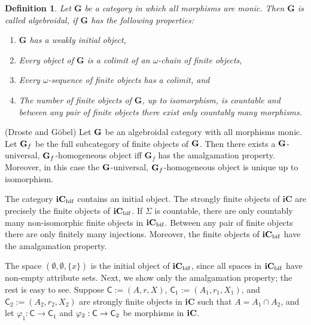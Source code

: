 \documentclass{LMCS}
\let\pf\proof
\newtheorem{defn}{Definition}[section]
\begin{document}
\begin{defn}
  Let $\mathbf{G}$ be a category in which all morphisms are monic. 
  Then $\mathbf{G}$ is called \emph{algebroidal}, if $\mathbf{G}$ has
  the following properties:

\begin{enumerate}[(1)]
\item $\mathbf{G}$ has a weakly initial object,
\item Every object of $\mathbf{G}$ is a colimit of an $\omega$-chain of
finite objects,
\item Every $\omega$-sequence of finite objects has a colimit, and
\item The number of finite objects of $\mathbf{G}$, up to isomorphism,
  is countable and between any pair of finite objects there exist only
  countably many morphisms. 
\end{enumerate}

\end{defn}


\begin{thm}\label{th:univ} (Droste and G\"{o}bel)
  Let ${\bf G}$ be an algebroidal category with all morphisms monic. 
  Let ${\bf G}_f$ be the full subcategory of finite objects of ${\bf
    G}$.  Then there exists a ${\bf G}$-universal, ${\bf
    G}_f$-homogeneous object iff $\mathbf{G}_f$ has the amalgamation
  property.  Moreover, in this case the ${\bf G}$-universal, ${\bf
    G}_f$-homogeneous object is unique up to isomorphism. 
\end{thm}


\begin{prop}\label{amalg} The category $\mathbf{iC}_{\rm bif}$
  contains an initial object. The strongly finite objects of
  $\mathbf{iC}$ are precisely the finite objects of $\mathbf{iC}_{\rm
    bif}$. If $\Sigma$ is countable, there are only countably many
  non-isomorphic finite objects in ${\bf iC}_{\rm bif}$. 
  Between any pair of finite objects there are only finitely
  many injections. Moreover, the finite objects of ${\bf
    iC}_{\rm bif}$ have the amalgamation property. 
\end{prop}

\pf The space $(\emptyset, \emptyset, \{x\})$ is the initial object of
$\mathbf{iC}_{\rm bif}$, since all spaces in $\mathbf{iC}_{\rm bif}$
have non-empty attribute sets. Next, we show only the amalgamation
property; the rest is easy to see.  Suppose $\mathsf{C}:=(A, r, X)$,
$\mathsf{C}_1:=(A_1, r_1, X_1)$, and $\mathsf{C}_2:=(A_2, r_2, X_2)$ are
strongly finite objects in {\bf iC} such that $A=A_1\cap A_2$, and let
$\varphi_1: \mathsf{C}\to \mathsf{C}_1$ and $\varphi_2: \mathsf{C}\to {\sf
  C}_2$ be morphisms in ${\bf iC}$. 
\end{document}

